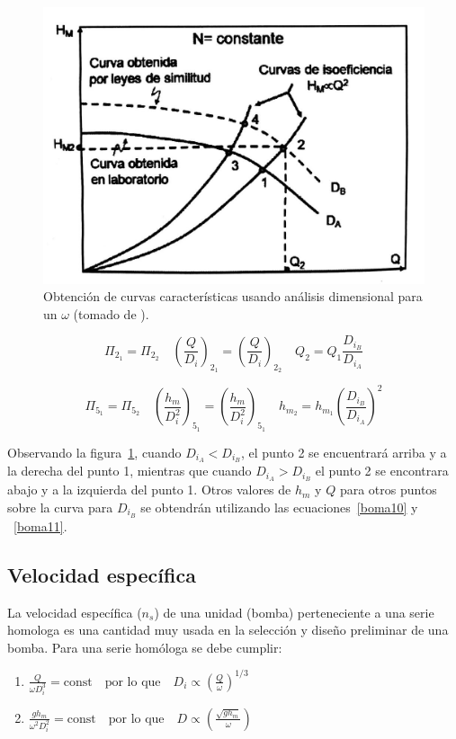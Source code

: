 \documentclass[11pt, oneside]{article}
\begin{document}
\begin{figure}[h]
\centering
\includegraphics[width=12cm]{./figs/bom9.jpeg}
\caption{Obtenci\'on de curvas caracter\'isticas usando an\'alisis dimensional para un $\omega$ (tomado de \cite{agudelo2011mecanica}).} 
\label{bom9}
\end{figure}


\begin{equation}
\Pi_{2_1} = \Pi_{2_2} \quad \left( \frac{Q}{D_i} \right)_{2_1} = \left( \frac{Q}{D_i} \right)_{2_2} \quad Q_2 = Q_1 \frac{D_{i_B}}{D_{i_A}}
\label{boma10}
\end{equation}

\begin{equation}
\Pi_{5_1} = \Pi_{5_2} \quad \left( \frac{h_m}{D_i^2} \right)_{5_1} = \left( \frac{h_m}{D_i^2} \right)_{5_1} \quad h_{m_2} = h_{m_1} \left(\frac{D_{i_B}}{D_{i_A}}\right)^2
\label{boma11}
\end{equation}
 
Observando la figura~\ref{bom9}, cuando $D_{i_A} < D_{i_B}$, el punto 2 se encuentrar\'a arriba y a la derecha del punto 1, mientras que cuando $D_{i_A} > D_{i_B}$ el punto 2 se encontrara abajo y a la izquierda del punto 1. Otros valores de $h_m$ y $Q$ para otros puntos sobre la curva para $D_{i_B}$ se obtendr\'an utilizando las ecuaciones~\ref{boma10} y ~\ref{boma11}. 

\subsection{Velocidad espec\'ifica}
La velocidad espec\'ifica ($n_s$) de una unidad (bomba) perteneciente a una serie homologa es una cantidad muy usada en la selecci\'on y dise\~no preliminar de una bomba. Para una serie hom\'ologa se debe cumplir:
\begin{enumerate} 
\item $ \frac{Q}{\omega D_i^3} = \text{const} \quad \text{por lo que} \quad D_i \propto \left( \frac{Q}{\omega} \right)^{1/3} $
\item $ \frac{g h_m}{\omega^2 D_i^2} = \text{const} \quad \text{por lo que} \quad D \propto \left( \frac{\sqrt{g h_m}}{\omega} \right) $
\end{enumerate} 
\end{document}
